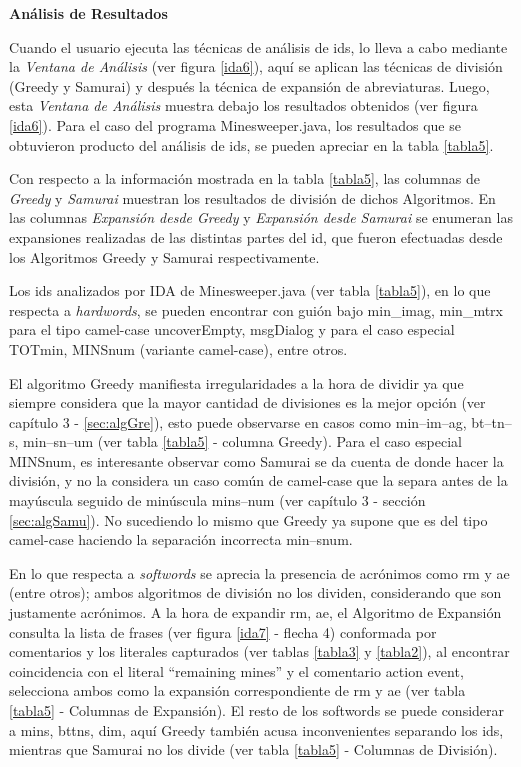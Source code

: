 \clearpage

\noindent \textbf{Análisis de Resultados\\}

Cuando el usuario ejecuta las técnicas de análisis de ids, lo lleva a cabo mediante la \textit{Ventana de Análisis} (ver figura \ref{ida6}), aquí se aplican las técnicas de división (Greedy y Samurai) y después la técnica de expansión de abreviaturas.
Luego, esta \textit{Ventana de Análisis} muestra debajo los resultados obtenidos (ver figura \ref{ida6}). Para el caso del programa Minesweeper.java, los resultados que se obtuvieron producto del análisis de ids, se pueden apreciar en la tabla \ref{tabla5}.

Con respecto a la información mostrada en la tabla \ref{tabla5}, las columnas de \textit{Greedy} y \textit{Samurai} muestran los resultados de división de dichos Algoritmos. En las columnas \textit{Expansión desde Greedy} y \textit{Expansión desde Samurai} se enumeran las expansiones realizadas de las distintas partes del id, que fueron efectuadas desde los Algoritmos Greedy y Samurai respectivamente.

Los ids analizados por IDA de Minesweeper.java (ver tabla \ref{tabla5}), en lo que respecta a \textit{hardwords}, se pueden encontrar con guión bajo  \textsf{min\_imag}, \textsf{min\_mtrx}  para el tipo camel-case  \textsf{uncoverEmpty}, \mbox{\textsf{msgDialog}} y para el caso especial \textsf{TOTmin}, \textsf{MINSnum} (variante camel-case), entre otros. 

El algoritmo Greedy manifiesta irregularidades a la hora de dividir ya que siempre considera que la mayor cantidad de divisiones es la mejor opción (ver capítulo 3 - \ref{sec:algGre}), esto puede observarse en casos como \textsf{min--im--ag},  \textsf{bt--tn--s}, \textsf{min--sn--um} (ver tabla \ref{tabla5} - columna Greedy). Para el caso especial \textsf{MINSnum}, es interesante observar como Samurai se da cuenta de donde hacer la división, y no la considera un caso común de camel-case que la separa antes de la mayúscula seguido de minúscula \textsf{mins--num} (ver capítulo 3 - sección \ref{sec:algSamu}). No sucediendo lo mismo que Greedy ya supone que es del tipo camel-case haciendo la separación incorrecta \textsf{min--snum}.

En lo que respecta a \textit{softwords} se aprecia la presencia de acrónimos como \textsf{rm} y \textsf{ae} (entre otros); ambos algoritmos de división no los dividen, considerando que son justamente acrónimos. A la hora de expandir \textsf{rm}, \textsf{ae}, el Algoritmo de Expansión consulta la lista de frases (ver figura \ref{ida7} - flecha 4) conformada por comentarios y los literales capturados (ver tablas \ref{tabla3} y \ref{tabla2}), al encontrar coincidencia con el literal \textsf{“remaining mines”} y el comentario \textsf{action event}, selecciona ambos como la expansión correspondiente de \textsf{rm} y \textsf{ae} (ver tabla \ref{tabla5} - Columnas de Expansión).
El resto de los softwords se puede considerar a \textsf{mins}, \textsf{bttns}, \textsf{dim}, aquí Greedy también acusa inconvenientes separando los ids, mientras que Samurai no los divide (ver tabla \ref{tabla5} - Columnas de División). %

